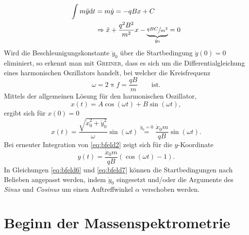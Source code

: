 \begin{equation}
\label{eq:bfeld3}
\begin{alignedat}{2}
\int m\ddot{y}\mathrm{d}t&=  m\dot{y}=  -qBx + C\\
&\Rightarrow \ddot{x}+\frac{q^2B^2}{m^2}x -\underbrace{\sfrac{qBC}{m^2}}_{\dot{y}_0} =  0
\end{alignedat}
\end{equation}
Wird die Beschleunigungskonstante $\dot{y}_0$ über die Startbedingung $\dot{y}(0)=0$ eliminiert, so erkennt man mit \textsc{Greiner}, dass es sich um die Differentialgleichung eines harmonischen Oszillators handelt, bei welcher die Kreisfrequenz\vspace*{-2.5cm}\vspace*{2.5cm}
\begin{equation}
\label{eq:bfeld4}
\omega = 2\uppi f = \frac{qB}{m}\qquad \text{ist.}
\end{equation}
Mittels der allgemeinen Lösung für den harmonischen Oszillator,
\begin{equation}
\label{eq:bfeld5}
x(t)=A\cos(\omega t)+B\sin(\omega t),
\end{equation}
ergibt sich für $x(0)=0$
\begin{equation}
\label{eq:bfeld6}
x(t)=\frac{\sqrt{\dot{x}_0^2+\dot{y}_0^2}}{\omega}\sin(\omega t)\overset{\dot{y}_0=0}{=}\frac{\dot{x}_0m}{qB}\sin(\omega t).
\end{equation}
Bei erneuter Integration von \eqref{eq:bfeld2} zeigt sich für die $y$-Koordinate
\begin{equation}
\label{eq:bfeld7}
y(t)=\frac{\dot{x}_0m}{qB}(\cos(\omega t)-1).
\end{equation}
In Gleichungen \eqref{eq:bfeld6} und \eqref{eq:bfeld7} können die Startbedingungen nach Belieben angepasst werden, indem $\dot{y}_0$ eingesetzt und/oder die Argumente des \textit{Sinus} und \textit{Cosinus} um einen Auftreffwinkel $\alpha$ verschoben werden.


\section{Beginn der Massenspektrometrie}
\label{sec:2.2}


